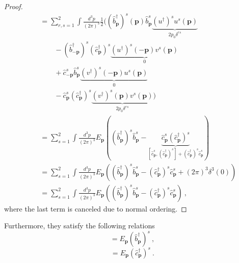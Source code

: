 \begin{proof}
\begin{equation*}
\begin{aligned}
            \phantom{\hat H} & = \sum_{r, s=1}^{2} \int \frac{d^3 p}{(2\pi)^3} \frac{1}{2} \Big ( (\hat b^\dagger_{\mathbf p})^s (\mathbf p) \hat b^s_{\mathbf p} \underbrace{(u^\dagger)^s u^s (\mathbf p) }_{2 p_0 \delta^{rs}} \\ & \qquad - (\hat b^\dagger_{- \mathbf p})^s (\hat c^\dagger_{\mathbf p})^s \underbrace{(u^\dagger)^s (- \mathbf p) v^s (\mathbf p) }_0 \\ & \qquad + \hat c^s_{- \mathbf p} \hat b^s_{\mathbf p} \underbrace{(v^\dagger)^s (- \mathbf p) u^s (\mathbf p)}_0 \\ & \qquad - \hat c^s_{\mathbf p} (\hat c^\dagger_{\mathbf p})^s \underbrace{(v^\dagger)^s (\mathbf p) v^s (\mathbf p)}_{2 p_0 \delta^{rs}} \Big ) \\ & = \sum_{s = 1}^{2} \int \frac{d^3 p}{(2\pi)^3} E_{\mathbf p} ((\hat b^\dagger_{\mathbf p})^s \hat b^s_{\mathbf p} - \underbrace{\hat c^s_{\mathbf p} (\hat c^\dagger_{\mathbf p})^s}_{[\hat c^s_{\mathbf p}, (\hat c^\dagger_{\mathbf p})^s] + (\hat c^\dagger_{\mathbf p})^s \hat c^s_{\mathbf p}} ) \\ & = \sum_{s=1}^{2} \int \frac{d^3 p}{(2\pi)^3} E_{\mathbf p} ((\hat b^\dagger_{\mathbf p})^s \hat b^s_{\mathbf p} - (\hat c^\dagger_{\mathbf p})^s \hat c^s_{\mathbf p} + (2\pi)^3 \delta^3 (0)) \\ & = \sum_{s=1}^{2} \int \frac{d^3 p}{(2\pi)^3} E_{\mathbf p} ((\hat b^\dagger_{\mathbf p})^s \hat b^s_{\mathbf p} - (\hat c^\dagger_{\mathbf p})^s \hat c^s_{\mathbf p}) ~,
        \end{aligned}
        \end{equation*}
        where the last term is canceled due to normal ordering.
    \end{proof}

    Furthermore, they satisfy the following relations 
    \begin{equation*}
        [\hat H, (\hat b^\dagger_{\mathbf p})^s] = E_{\mathbf p} (\hat b^\dagger_{\mathbf p})^s ~,
    \end{equation*}
    \begin{equation*}
        [\hat H, (\hat c^\dagger_{\mathbf p})^s] = E_{\mathbf p} (\hat c^\dagger_{\mathbf p})^s ~.
    \end{equation*}


